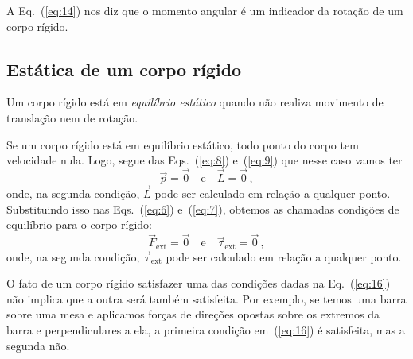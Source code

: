 \documentclass[twocolumn=on,DIV=calc]{scrartcl}
\theoremstyle{definition}
\begin{document}
A Eq.~(\ref{eq:14}) nos diz que o momento angular é um indicador da
rotação de um corpo rígido.

\subsection{Estática de um corpo rígido}
Um corpo rígido está em \textit{equilíbrio estático} quando não
realiza movimento de translação nem de rotação.

Se um corpo rígido está em equilíbrio estático, todo ponto do corpo
tem velocidade nula. Logo, segue das Eqs.~(\ref{eq:8}) e~(\ref{eq:9})
que nesse caso vamos ter
$$\vec p=\vec 0\quad\text{e}\quad\vec L=\vec 0\,,$$
onde, na segunda condição, $\vec L$ pode ser calculado em relação a
qualquer ponto. Substituindo isso nas Eqs.~(\ref{eq:6})
e~(\ref{eq:7}), obtemos as chamadas condições de equilíbrio para o
corpo rígido:
\begin{equation}
  \label{eq:16}
  {\vec F}_{\mathrm{ext}}=\vec 0\quad\text{e}\quad \vec\tau_{\mathrm{ext}}=\vec 0\,,
\end{equation}
onde, na segunda condição, $\vec\tau_{\mathrm{ext}}$ pode ser
calculado em relação a qualquer ponto.

O fato de um corpo rígido satisfazer uma das condições dadas na
Eq.~(\ref{eq:16}) não implica que a outra será também satisfeita. Por
exemplo, se temos uma barra sobre uma mesa e aplicamos forças de
direções opostas sobre os extremos da barra e perpendiculares a ela, a
primeira condição em~(\ref{eq:16}) é satisfeita, mas a segunda não.
\end{document}
